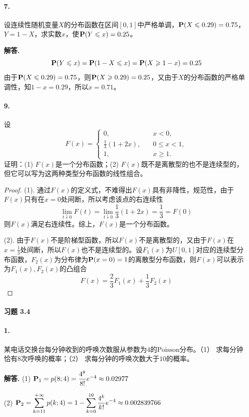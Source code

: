 \documentclass[12pt, a4paper, oneside]{ctexart}
\newenvironment{solution}{\par\noindent\textbf{解答. }}{\bigskip\par}
\begin{document}
\paragraph{7.}设连续性随机变量$X$的分布函数在区间$[0,1]$中严格单调，$\P(X\leqslant 0.29)=0.75$，$Y=1-X$，求实数$x$，使$\P(Y\leqslant x) = 0.25$。
\begin{solution}
    \begin{equation*}
        \P(Y\leqslant x) = \P(1-X\leqslant x) = \P(X\geqslant 1-x) = 0.25
    \end{equation*}
    由于$\P(X\leqslant 0.29)=0.75$，则$\P(X\geqslant 0.29)=0.25$，又由于$X$的分布函数的严格单调性，知$1-x=0.29$，所以$x = 0.71$。
\end{solution}
\paragraph{9.}设\begin{equation*}
    F(x)=\begin{cases}
        0,\quad&x<0,\\
        \frac{1}{3}(1+2x),\quad&0\leqslant x < 1,\\
        1,\quad&x \geqslant 1.
    \end{cases}
\end{equation*}
证明：(1) $F(x)$是一个分布函数；(2) $F(x)$既不是离散型的也不是连续型的，但它可以写为这两种类型分布函数的线性组合。
\begin{proof}
    (1). 通过$F(x)$的定义式，不难得出$F(x)$具有非降性，规范性，由于$F(x)$只有在$x=0$处间断，所以考虑该点的右连续性
    \begin{equation*}
        \lim_{t\downarrow 0}F(t) = \lim_{t\downarrow 0}\frac{1}{3}(1+2x)=\frac{1}{3} = F(0)
    \end{equation*}
    则$F(x)$满足右连续性。综上，$F(x)$是一个分布函数。

    (2). 由于$F(x)$不是阶梯型函数，所以$F(x)$不是离散型的，又由于$F(x)$在$x=\frac{1}{3}$处间断，所以$F(x)$也不是连续型的。设$F_1(x)$为$U[0,1]$对应的连续型分布函数，$F_2(x)$为分布律为$\P(x = 0) = 1$的离散型分布函数，则$F(x)$可以表示为$F_1(x),F_2(x)$的凸组合
    \begin{equation*}
        F(x) = \frac{2}{3}F_1(x) +\frac{1}{3}F_2(x)
    \end{equation*}
\end{proof}
\paragraph{习题 3.4}
\paragraph{1.}某电话交换台每分钟收到的呼唤次数服从参数为$4$的$\text{Poisson}$分布。（1） 求每分钟恰有$8$次呼唤的概率；（2） 求每分钟的呼唤次数大于$10$的概率。
\begin{solution}
    (1) $\P_1=  p(8; 4) = \dfrac{4^8}{8!}e^{-4} \approx 0.02977$

    (2) $\P_2 = \displaystyle\sum_{k=11}^{+\infty}p(k;4) = 1-\sum_{k=0}^{10}\frac{4^k}{k!}e^{-4} \approx 0.002839766$
\end{solution}
\end{document}
